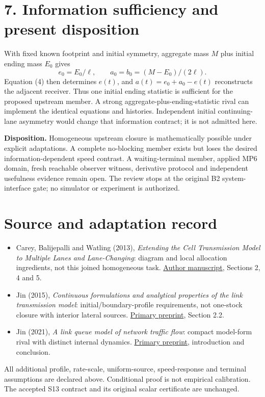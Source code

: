 \documentclass[11pt,a4paper]{article}
\begin{document}
\section*{7. Information sufficiency and present disposition}
With fixed known footprint and initial symmetry, aggregate mass $M$ plus
initial ending mass $E_0$ gives
\[
 e_0=E_0/\ell,\qquad a_0=b_0=(M-E_0)/(2\ell).
\]
Equation (4) then determines $e(t)$, and $a(t)=e_0+a_0-e(t)$ reconstructs
the adjacent receiver. Thus one initial ending statistic is sufficient for
the proposed upstream member. A strong aggregate-plus-ending-statistic rival
can implement the identical equations and histories. Independent initial
continuing-lane asymmetry would change that information contract; it is not
admitted here.

\textbf{Disposition.} Homogeneous upstream closure is mathematically possible
under explicit adaptations. A complete no-blocking member exists but loses
the desired information-dependent speed contrast. A waiting-terminal member,
applied MP6 domain, fresh reachable observer witness, derivative protocol and
independent usefulness evidence remain open. The review stops at the original
B2 system-interface gate; no simulator or experiment is authorized.

\section*{Source and adaptation record}
\begin{itemize}
\item Carey, Balijepalli and Watling (2013), \emph{Extending the Cell
Transmission Model to Multiple Lanes and Lane-Changing}: diagram and local
allocation ingredients, not this joined homogeneous task.
\href{https://eprints.whiterose.ac.uk/id/eprint/77315/7/Carey\%20et\%20al\%202013_with_coversheet.pdf}{Author manuscript}, Sections 2, 4 and 5.
\item Jin (2015), \emph{Continuous formulations and analytical properties of
the link transmission model}: initial/boundary-profile requirements, not
one-stock closure with interior lateral sources.
\href{https://arxiv.org/pdf/1405.7080}{Primary preprint}, Section 2.2.
\item Jin (2021), \emph{A link queue model of network traffic flow}:
compact model-form rival with distinct internal dynamics.
\href{https://arxiv.org/pdf/1209.2361}{Primary preprint}, introduction and conclusion.
\end{itemize}
All additional profile, rate-scale, uniform-source, speed-response and terminal
assumptions are declared above. Conditional proof is not empirical calibration.
The accepted S13 contract and its original scalar certificate are unchanged.
\end{document}
